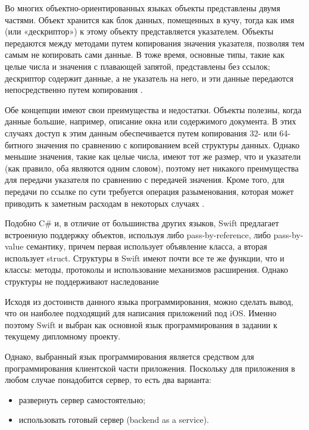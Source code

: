 Во многих объектно-ориентированных языках объекты представлены двумя частями. Объект хранится как блок данных, помещенных в кучу, тогда как имя (или «дескриптор») к этому объекту представляется указателем. Объекты передаются между методами путем копирования значения указателя, позволяя тем самым не копировать сами данные. В тоже время, основные типы, такие как целые числа и значения с плавающей запятой, представлены без ссылок; дескриптор содержит данные, а не указатель на него, и эти данные передаются непосредственно путем копирования \cite{swift_doc}.

Обе концепции имеют свои преимущества и недостатки. Объекты полезны, когда данные большие, например, описание окна или содержимого документа. В этих случаях доступ к этим данным обеспечивается путем копирования 32- или 64-битного значения по сравнению с копированием всей структуры данных. Однако меньшие значения, такие как целые числа, имеют тот же размер, что и указатели (как правило, оба являются одним словом), поэтому нет никакого преимущества для передачи указателя по сравнению с передачей значения. Кроме того, для передачи по ссылке по сути требуется операция разыменования, которая может приводить к заметным расходам в некоторых случаях \cite{swift_doc}.

Подобно C\# и, в отличие от большинства других языков, Swift предлагает встроенную поддержку объектов, используя либо pass-by-reference, либо pass-by-value семантику, причем первая использует объявление класса, а вторая использует struct. Структуры в Swift имеют почти все те же функции, что и классы: методы, протоколы и использование механизмов расширения. Однако структуры не поддерживают наследование

Исходя из достоинств данного языка программирования, можно сделать вывод, что он наиболее подходящий для написания приложений под iOS. Именно поэтому Swift и выбран как основной язык программирования в задании к текущему дипломному проекту.

Однако, выбранный язык программирования является средством для программирования клиентской части приложения. Поскольку для приложения в любом случае понадобится сервер, то есть два варианта: 

\begin{itemize}
	\item развернуть сервер самостоятельно;
	\item использовать готовый сервер (backend as a service).
\end{itemize}

